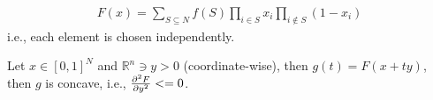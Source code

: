 \begin{definition}
	\begin{align}
	F(x) = \sum_{S \subseteq N} f(S) \prod_{i\in S} x_i \prod_{i \notin S} (1-x_i)
	\end{align}
	i.e., each element is chosen independently.
\end{definition}

\begin{prop}
	Let $x\in [0,1]^N$ and $\mathbb{R}^n \ni y>0$ (coordinate-wise), then $g(t)=F(x+ty)$, then $g$ is concave, i.e., $\pdv[2]{F}{y}<=0$.
\end{prop}